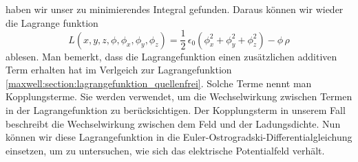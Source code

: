 haben wir unser zu minimierendes Integral gefunden.
Daraus können wir wieder die Lagrange funktion
\begin{equation}
L(x,y,z,\phi,\phi_x,\phi_y,\phi_z)
=
\frac{1}{2}\,\epsilon_0\left(\phi_x^2 + \phi_y^2 + \phi_z^2\right) - \phi\,\rho
\label{maxwell:section:lagrangefunktion_mit_quelle}
\end{equation}
ablesen.
Man bemerkt, dass die Lagrangefunktion einen zusätzlichen additiven Term erhalten hat im Verlgeich zur Lagrangefunktion \eqref{maxwell:section:lagrangefunktion_quellenfrei}.
Solche Terme nennt man Kopplungsterme.
Sie werden verwendet, um die Wechselwirkung zwischen Termen in der Lagrangefunktion zu berücksichtigen.
Der Kopplungsterm in unserem Fall beschreibt die Wechselwirkung zwischen dem Feld und der Ladungsdichte.
Nun können wir diese Lagrangefunktion in die Euler-Ostrogradski-Differentialgleichung einsetzen, um zu untersuchen, wie sich das elektrische Potentialfeld verhält.

